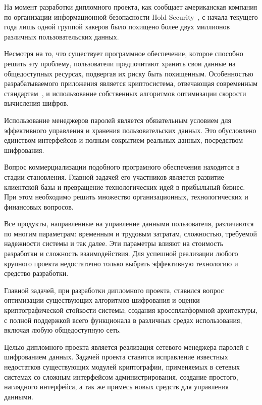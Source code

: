 \label{sec:intro}

На момент разработки дипломного проекта, как сообщает американская компания по организации информационной безопасности Hold Security~\cite{cyber_vor}, с начала текущего года лишь одной группой хакеров было похищено более двух миллионов различных пользовательских данных.

Несмотря на то, что существует программное обеспечение, которое способно решить эту проблему, пользователи предпочитают хранить свои данные на общедоступных ресурсах, подвергая их риску быть похищенным. Особенностью разрабатываемого приложения является криптосистема, отвечающая современным стандартам~\cite{ecma_335}, и использование собственных алгоритмов оптимизации скорости вычисления шифров.

Использование менеджеров паролей является обязательным условием для эффективного управления и хранения пользовательских данных. Это обусловлено единством интерфейсов и полным сокрытием реальных данных, посредством шифрования.

Вопрос коммерциализации подобного програмного обеспечения находится в стадии становления. Главной задачей его участников является развитие клиентской базы и превращение технологических идей в прибыльный бизнес. При этом необходимо решить множество организационных, технологических и финансовых вопросов.

Все продукты, направленные на управление данными пользователя, различаются по многим параметрам: временным и трудовым затратам, сложностью, требуемой надежности системы и так далее. Эти параметры влияют на стоимость разработки и сложность взаимодействия. Для успешной реализации любого крупного проекта недостаточно только выбрать эффективную технологию и средство разработки.

Главной задачей, при разработки дипломного проекта, ставился вопрос оптимизации существующих алгоритмов шифрования и оценки криптографической стойкости системы; создания кроссплатформной архитектуры, с полной поддержкой всего функционала в различных средах использования, включая любую общедоступную сеть.

Целью дипломного проекта является реализация сетевого менеджера паролей с шифрованием данных. Задачей проекта ставится исправление известных недостатков существующих модулей криптографии, применяемых в сетевых системах со сложным интерфейсом администрирования, создание простого, наглядного интерфейса, а так же примесь новых средств для управления данными.